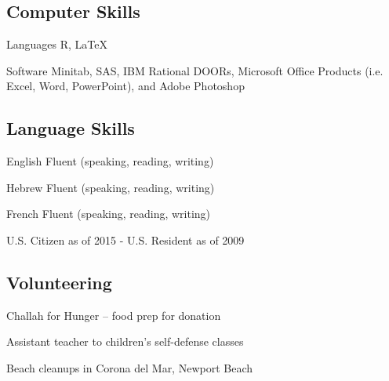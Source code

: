 \documentclass[10pt,letterpaper]{article}
\begin{document}
\subsection*{Computer Skills}
\begin{rlist}
	\item[Languages] R, \LaTeX
	\item[Software] Minitab, SAS, IBM Rational DOORs, Microsoft Office Products (i.e. Excel, Word, PowerPoint), and Adobe Photoshop
\end{rlist}

\subsection*{Language Skills}
\begin{rlist}
	\item[English] Fluent (speaking, reading, writing)
	\item[Hebrew] Fluent (speaking, reading, writing)
	\item[French] Fluent (speaking, reading, writing)
	\item U.S. Citizen as of 2015 - U.S. Resident as of 2009
\end{rlist}

\subsection*{Volunteering}
\begin{rlist}
	\item Challah for Hunger – food prep for donation
	\item Assistant teacher to children’s self-defense classes
	\item Beach cleanups in Corona del Mar, Newport Beach
\end{rlist}
\end{document}
